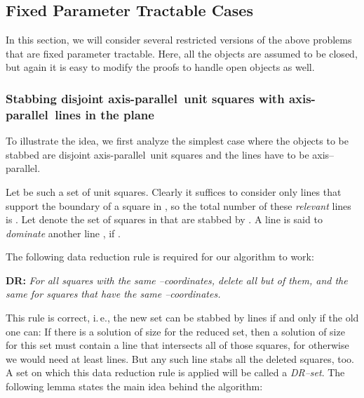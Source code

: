 \documentclass[12pt]{article}
\newcommand{\ap}{a.p.\ }
\renewcommand{\ap}{axis-parallel\ }
\begin{document}
 
\subsection{Fixed Parameter Tractable Cases}\label{section:FPT}
In this section, we will consider several restricted versions of the above problems that are fixed parameter tractable. Here, all the objects are assumed to be closed, but again it is easy to modify the proofs to handle open objects as well.

\subsubsection{Stabbing disjoint \ap unit squares with \ap lines in the
  plane}\label{sssection:FPTDisjointUnitSquares}

To illustrate the idea, we first analyze the simplest case where the objects to be stabbed are disjoint \ap unit squares and the lines have to be axis--parallel.

Let  be such a set of unit squares. Clearly it suffices to consider only lines that support the boundary of a square in , so the total number of these \textit{relevant} lines is . Let  denote the set of squares in  that are stabbed by . A line  is said to \emph{dominate} another line , if .

The following data reduction rule is required for our algorithm to work:

\textbf{DR:} 
\emph{For all  squares with the same --coordinates, delete
  all but  of them, and the same for  squares that have
  the same --coordinates.}

This rule is correct, i.\,e., the new set can be stabbed by  lines if and only if the old one can: If there is a solution of size  for the reduced set, then a solution of size  for this set must contain a line that intersects all of those squares, for otherwise we would need at least  lines. But any such line stabs all the deleted squares, too.\\

A set on which this data reduction rule is applied will be called a \textit{DR--set}. The following lemma states the main idea behind the algorithm:
\end{document}
